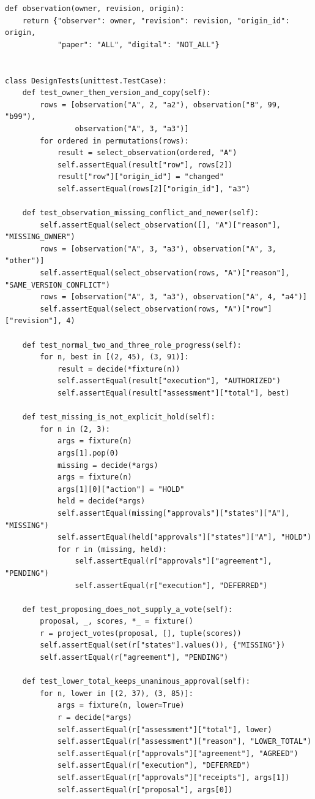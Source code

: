 \documentclass[10pt,a4paper]{article}
\begin{document}
\begin{verbatim}
def observation(owner, revision, origin):
    return {"observer": owner, "revision": revision, "origin_id": origin,
            "paper": "ALL", "digital": "NOT_ALL"}


class DesignTests(unittest.TestCase):
    def test_owner_then_version_and_copy(self):
        rows = [observation("A", 2, "a2"), observation("B", 99, "b99"),
                observation("A", 3, "a3")]
        for ordered in permutations(rows):
            result = select_observation(ordered, "A")
            self.assertEqual(result["row"], rows[2])
            result["row"]["origin_id"] = "changed"
            self.assertEqual(rows[2]["origin_id"], "a3")

    def test_observation_missing_conflict_and_newer(self):
        self.assertEqual(select_observation([], "A")["reason"], "MISSING_OWNER")
        rows = [observation("A", 3, "a3"), observation("A", 3, "other")]
        self.assertEqual(select_observation(rows, "A")["reason"], "SAME_VERSION_CONFLICT")
        rows = [observation("A", 3, "a3"), observation("A", 4, "a4")]
        self.assertEqual(select_observation(rows, "A")["row"]["revision"], 4)

    def test_normal_two_and_three_role_progress(self):
        for n, best in [(2, 45), (3, 91)]:
            result = decide(*fixture(n))
            self.assertEqual(result["execution"], "AUTHORIZED")
            self.assertEqual(result["assessment"]["total"], best)

    def test_missing_is_not_explicit_hold(self):
        for n in (2, 3):
            args = fixture(n)
            args[1].pop(0)
            missing = decide(*args)
            args = fixture(n)
            args[1][0]["action"] = "HOLD"
            held = decide(*args)
            self.assertEqual(missing["approvals"]["states"]["A"], "MISSING")
            self.assertEqual(held["approvals"]["states"]["A"], "HOLD")
            for r in (missing, held):
                self.assertEqual(r["approvals"]["agreement"], "PENDING")
                self.assertEqual(r["execution"], "DEFERRED")

    def test_proposing_does_not_supply_a_vote(self):
        proposal, _, scores, *_ = fixture()
        r = project_votes(proposal, [], tuple(scores))
        self.assertEqual(set(r["states"].values()), {"MISSING"})
        self.assertEqual(r["agreement"], "PENDING")

    def test_lower_total_keeps_unanimous_approval(self):
        for n, lower in [(2, 37), (3, 85)]:
            args = fixture(n, lower=True)
            r = decide(*args)
            self.assertEqual(r["assessment"]["total"], lower)
            self.assertEqual(r["assessment"]["reason"], "LOWER_TOTAL")
            self.assertEqual(r["approvals"]["agreement"], "AGREED")
            self.assertEqual(r["execution"], "DEFERRED")
            self.assertEqual(r["approvals"]["receipts"], args[1])
            self.assertEqual(r["proposal"], args[0])


\end{verbatim}
\end{document}
